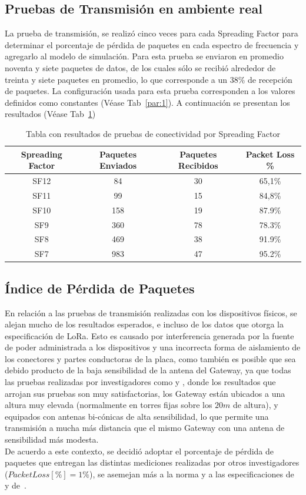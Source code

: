 \begin{justify}
\subsection{Pruebas de Transmisión en ambiente real}
La prueba de transmisión, se realizó cinco veces para cada Spreading Factor para determinar el porcentaje de pérdida de paquetes en cada espectro de frecuencia y agregarlo al modelo de simulación. Para esta prueba se enviaron en promedio noventa y siete paquetes de datos, de los cuales sólo se recibió alrededor de treinta y siete paquetes en promedio, lo que corresponde a un $38\%$ de recepción de paquetes. La configuración usada para esta prueba corresponden a los valores definidos como constantes (Véase Tab~\ref{par:1}). A continuación se presentan los resultados (Véase Tab~\ref{prueba:3})
\begin{table}[!ht]
\centering
\begin{tabular}{|c|c|c|c|}
\hline
Spreading Factor & Paquetes Enviados & Paquetes Recibidos & Packet Loss \% \\ 
\hline
SF12 & 84 & 30 & 65,1\% \\
\hline
SF11 & 99 & 15 & 84,8\% \\
\hline
SF10 & 158 & 19 & 87.9\% \\
\hline
SF9 & 360 & 78 & 78.3\% \\
\hline
SF8 & 469 & 38 & 91.9\% \\
\hline
SF7 & 983 & 47 & 95.2\% \\
\hline
\end{tabular}
\caption{Tabla con resultados de pruebas de conectividad por Spreading Factor}
\label{prueba:3}
\end{table}

\subsection{Índice de Pérdida de Paquetes}
En relación a las pruebas de transmisión realizadas con los dispositivos físicos, se alejan mucho de los resultados esperados, e incluso de los datos que otorga la especificación de LoRa. Esto es causado por interferencia generada por la fuente de poder administrada a los dispositivos y una incorrecta forma de aislamiento de los conectores y partes conductoras de la placa, como también es posible que sea debido producto de la baja sensibilidad de la antena del Gateway, ya que todas las pruebas realizadas por investigadores como \cite{Xavier} y \cite{Juha}, donde los resultados que arrojan sus pruebas son muy satisfactorias, los Gateway están ubicados a una altura muy elevada (normalmente en torres fijas sobre los $20m$ de altura), y equipados con antenas bi-cónicas de alta sensibilidad, lo que permite una transmisión a mucha más distancia que el mismo Gateway con una antena de sensibilidad más modesta.\\
De acuerdo a este contexto, se decidió adoptar el porcentaje de pérdida de paquetes que entregan las distintas mediciones realizadas por otros investigadores ($PacketLoss[\%]=1\%$), se asemejan más a la norma y a las especificaciones de ~\cite{Xavier} y de~\cite{Juha}.


\end{justify}
